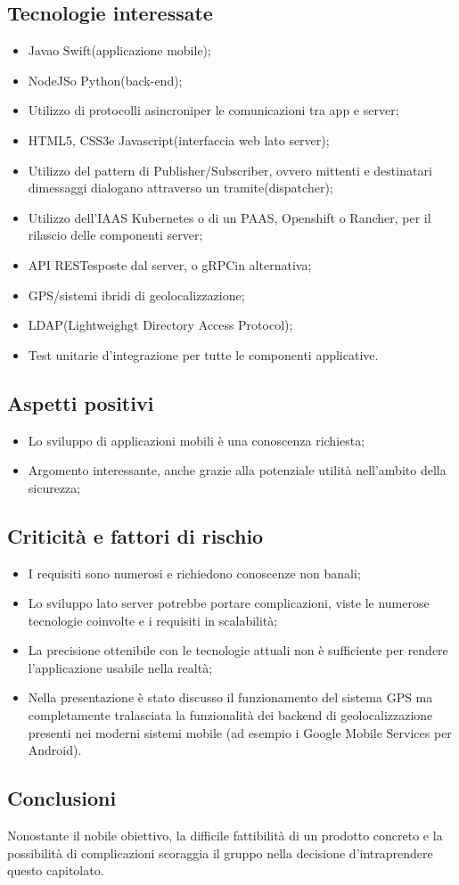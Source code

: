 \subsection{Tecnologie interessate}
\begin{itemize}
	\item Java\glo o Swift\glo (applicazione mobile);
	\item NodeJS\glo o Python\glo (back-end\glo);
	\item Utilizzo di protocolli asincroni\glosp per le comunicazioni tra app e server;
	\item HTML5\glo, CSS3\glo e Javascript\glo (interfaccia web lato server);
	\item Utilizzo del pattern di Publisher/Subscriber\glo, ovvero mittenti e destinatari dimessaggi dialogano attraverso un tramite(dispatcher);
	\item Utilizzo dell’IAAS Kubernetes o di un PAAS, Openshift o Rancher, per il rilascio delle componenti server;
	\item API REST\glosp esposte dal server, o gRPC\glo in alternativa;
	\item GPS\glo/sistemi ibridi di geolocalizzazione;
	\item LDAP\glo (Lightweighgt Directory Access Protocol);
	\item Test unitari\glosp e d'integrazione per tutte le componenti applicative.
\end{itemize}

\subsection{Aspetti positivi}
\begin{itemize}
	\item Lo sviluppo di applicazioni mobili è una conoscenza richiesta;
	\item Argomento interessante, anche grazie alla potenziale utilità nell'ambito della sicurezza;
\end{itemize}

\subsection{Criticità e fattori di rischio}
\begin{itemize}
	\item I requisiti sono numerosi e richiedono conoscenze non banali;
	\item Lo sviluppo lato server potrebbe portare complicazioni, viste le numerose tecnologie coinvolte e i requisiti in scalabilità;
	\item La precisione ottenibile con le tecnologie attuali non è sufficiente per rendere l’applicazione usabile nella realtà;
	\item Nella presentazione è stato discusso il funzionamento del sistema GPS ma completamente tralasciata la funzionalità dei backend di geolocalizzazione presenti nei moderni sistemi mobile (ad esempio i Google Mobile Services per Android).
\end{itemize}

\subsection{Conclusioni}
Nonostante il nobile obiettivo, la difficile fattibilità di un prodotto concreto e la possibilità di complicazioni scoraggia il gruppo nella decisione d'intraprendere questo capitolato.
